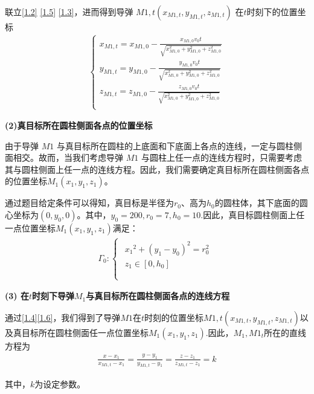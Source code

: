 \documentclass[../main.tex]{subfiles}
\begin{document}
\par 联立\eqref{1.2} \eqref{1.5} \eqref{1.3}，进而得到导弹 \( M1,t(x_{M1,t}, y_{M1,t}, z_{M1,t}) \) 在$t$时刻下的位置坐标
\begin{align}\label{1.4}
\left\{ \begin{array}{l}
	x_{M1,t}=x_{M1,0}-\frac{x_{M1,0}v_0t}{\sqrt{x_{M1,0}^{2}+y_{M1,0}^{2}+z_{M1,0}^{2}}}\\
	y_{M1,t}=y_{M1,0}-\frac{y_{M1,0}v_0t}{\sqrt{x_{M1,0}^{2}+y_{M1,0}^{2}+z_{M1,0}^{2}}}\\
	z_{M1,t}=z_{M1,0}-\frac{z_{M1,0}v_0t}{\sqrt{x_{M1,0}^{2}+y_{M1,0}^{2}+z_{M1,0}^{2}}}\\
\end{array} \right. 
\end{align}





\noindent\textbf{(2)真目标所在圆柱侧面各点的位置坐标}
\par 由于导弹 \( M1 \) 与真目标所在圆柱的上底面和下底面上各点的连线，一定与圆柱侧面相交。故而，当我们考虑导弹 \( M1 \) 与圆柱上任一点的连线方程时，只需要考虑其与圆柱侧面上任一点的连线方程。因此，我们需要确定真目标所在圆柱侧面各点的位置坐标$M_1\left( x_1,y_1,z_1 \right) $。
\par 通过题目给定条件可以得知，真目标是半径为$r_0$、高为$h_0$的圆柱体，其下底面的圆心坐标为$\left( 0,y_0,0 \right)$。其中，$y_0=200,r_0=7,h_0=10$.因此，真目标圆柱侧面上任一点位置坐标$M_1\left( x_1,y_1,z_1 \right) $满足：
\begin{align}\label{1.6}
\varGamma _0:\left\{ \begin{array}{c}
	\begin{array}{l}
	{x_1}^2+\left( {y_1}-y_0 \right) ^2=r_{0}^{2}\\
	{z_1}\in \left[ 0,h_0 \right]\\
\end{array}\\
\end{array} \right. 
\end{align}





\noindent\textbf{(3) 在\( t \)时刻下导弹\( M_1 \)与真目标所在圆柱侧面各点的连线方程}
\par 通过\eqref{1.4}\eqref{1.6}，我们得到了导弹$M1$在\( t \)时刻的位置坐标\( M1,t(x_{M1,t}, y_{M1,t}, z_{M1,t}) \)以及真目标所在圆柱侧面任一点位置坐标$M_1\left( x_1,y_1,z_1 \right) $.因此，$M_1,M1_t$所在的直线方程为
\begin{align}\label{1.7}
\frac{x-x_1}{x_{M1,t}-x_1}=\frac{y-y_1}{y_{M1,t}-y_1}=\frac{z-z_1}{z_{M1,t}-z_1}=k 
\end{align}
\par 其中，$k$为设定参数。
\end{document}

